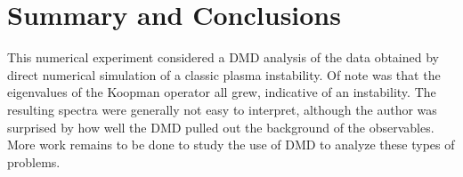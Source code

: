 \documentclass{article}
\begin{document}



\section{Summary and Conclusions}
This numerical experiment considered a DMD analysis of the data obtained by direct numerical simulation of a classic plasma instability. Of note was that the eigenvalues of the Koopman operator all grew, indicative of an instability. The resulting spectra were generally not easy to interpret, although the author was surprised by how well the DMD pulled out the background of the observables. More work remains to be done to study the use of DMD to analyze these types of problems.
\end{document}

